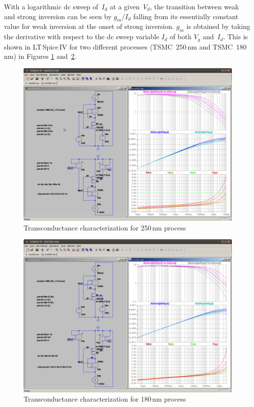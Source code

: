 \documentclass[journal]{IEEEtran}
\begin{document}
With a logarithmic dc sweep of~$I_d$ at a given~$V_d$, the transition between weak and strong inversion can be seen by $g_m/I_d$ falling from its essentially constant value for weak inversion at the onset of strong inversion. 
$g_m$ is obtained by taking the derivative with respect to the dc sweep variable $I_d$ 
of both $V_g$ and~$I_d$.
This is shown in LT\,Spice\,IV for two different processes 
(TSMC~250\,nm and TSMC~180\,nm) in Figures \ref{fig:gm_mos25} and~\ref{fig:gm_mos18}. 

%
\begin{figure}[h]
\centering
\includegraphics[width=1.0\columnwidth]{figures/mos25u.pdf}
\caption{Transconductance characterization for 250\,nm process~\cite{mos25u}}
\label{fig:gm_mos25}
\end{figure}
%
\begin{figure}[h]
\centering
\includegraphics[width=1.0\columnwidth]{figures/mos18u.pdf}
\caption{Transconductance characterization for 180\,nm process~\cite{mos18u}}
\label{fig:gm_mos18}
\end{figure}
%
\end{document}
